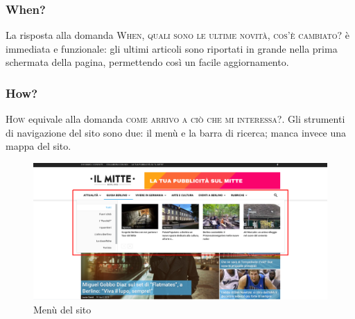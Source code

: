 \subsubsection{When?}
La risposta alla domanda \textsc{When}, \textsc{quali sono le ultime novità, cos'è cambiato?} è immediata e funzionale: gli ultimi articoli sono riportati in grande nella prima schermata della pagina, permettendo così un facile aggiornamento.

\subsubsection{How?}
\textsc{How} equivale alla domanda \textsc{come arrivo a ciò che mi interessa?}. Gli strumenti di navigazione del sito sono due: il menù e la barra di ricerca; manca invece una mappa del sito.

\vspace{30pt}
\begin{figure}[htbp]
\begin{center}
\includegraphics[width=35em]{img/menu}
\caption{Menù del sito}
\end{center}
\end{figure}
\vspace{30pt}

